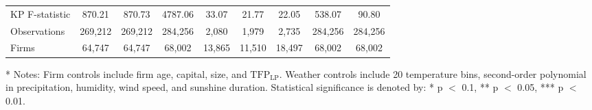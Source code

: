 \documentclass[12pt]{article}
\begin{document}
\begin{landscape}
\begin{table}[H]
\begin{tabular}{l*{8}{c}}
    \hline
    KP F-statistic   &870.21  &870.73 &4787.06   &33.07&21.77& 22.05&538.07 &90.80\\
    Observations     &269,212 &269,212&284,256 &2,080&1,979& 2,735&284,256&284,256\\
    Firms            &64,747  &64,747 &68,002  &13,865&11,510&18,497&68,002  &68,002\\
    \hline\hline
    \end{tabular}

    \begin{tablenotes}
    \item[*] \small Notes: Firm controls include firm age, capital, size, and $\mathrm{TFP_{LP}}$. Weather controls include 20 temperature bins, second-order polynomial in precipitation, humidity, wind speed, and sunshine duration. Statistical significance is denoted by: * p $<$ 0.1, ** p $<$ 0.05, *** p $<$ 0.01.
  \end{tablenotes}
  \end{table}
\end{landscape}
\end{document}
